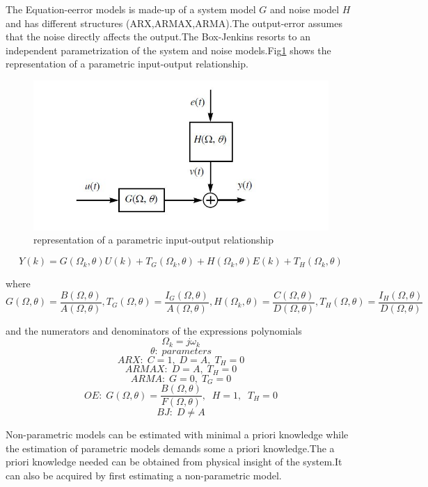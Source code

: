 \documentclass[a4paper,12pt]{article}
\numberwithin{equation}{section}
\begin{document}
The Equation-eerror models is made-up of a system model $G$ and noise model $H$ and has different structures (ARX,ARMAX,ARMA).The output-error assumes that the noise directly affects the output.The Box-Jenkins resorts to an independent parametrization of the system and noise models.Fig\ref{fig:par_res} shows the representation of a parametric input-output relationship.

\begin{figure}[H]
    \includegraphics[scale=1]{parametric_repre.JPG}
    \centering
    \caption{representation of a parametric input-output relationship}
    \label{fig:par_res}
\end{figure}

\begin{equation}\label{eq:trfctmodels}
Y(k)=G\left(\Omega_{k}, \theta\right) U(k)+T_{G}\left(\Omega_{k}, \theta\right)+H\left(\Omega_{k}, \theta\right) E(k)+T_{H}\left(\Omega_{k}, \theta\right)    
\end{equation}


\noindent
where
\[G(\Omega, \theta)=\frac{B(\Omega, \theta)}{A(\Omega, \theta)}, T_{G}(\Omega, \theta)=\frac{I_{G}(\Omega, \theta)}{A(\Omega, \theta)}, H\left(\Omega_{k}, \theta\right)=\frac{C(\Omega, \theta)}{D(\Omega, \theta)}, T_{H}(\Omega, \theta)=\frac{I_{H}(\Omega, \theta)}{D(\Omega, \theta)}\]

\noindent
and the numerators and denominators of the expressions polynomials
\[\Omega_{k}=j\omega_{k}\]
\[\theta:\;parameters\]
\[ARX:\; C=1,\; D=A,\; T_{H}=0\]
\[ARMAX:\; D=A,\; T_{H}=0 \]
\[ARMA:\; G=0,\; T_{G}=0\]
\[OE:\; G(\Omega, \theta)=\frac{B(\Omega, \theta)}{F(\Omega, \theta)},\;\;H=1 ,\;\; T_{H}=0  \]
\[BJ:\; D \neq A\]


Non-parametric models can be estimated with minimal a priori knowledge while the estimation of parametric models demands some a priori knowledge.The a priori knowledge needed can be obtained from physical insight of the system.It can also be acquired by first estimating a non-parametric model.
\end{document}
